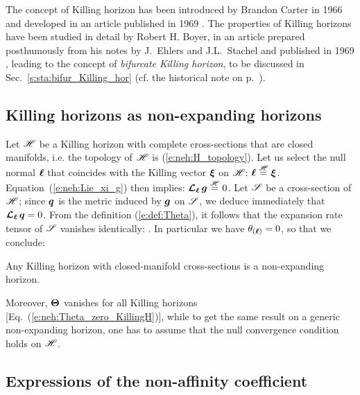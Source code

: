 \begin{hist}
The concept of Killing horizon has been introduced by Brandon Carter in
1966 \cite{Carte66,Carte67} and developed in an article published in
1969 \cite{Carte69}. The properties of Killing horizons have been
studied in detail by Robert H. Boyer,
in an article prepared posthumously from his notes
by J.~Ehlers and J.L.~Stachel and published in 1969 \cite{Boyer69},
leading to the concept of \emph{bifurcate Killing horizon}, to be discussed in
Sec.~\ref{s:sta:bifur_Killing_hor} (cf. the historical note on p.~\pageref{h:sta:Boyer}).
\end{hist}

\subsection{Killing horizons as non-expanding horizons}

Let $\mathscr{H}$ be a Killing horizon with complete cross-sections that are closed manifolds,
i.e. the topology of $\mathscr{H}$ is (\ref{e:neh:H_topology}). Let us select the null normal $\bm{\ell}$
that coincides with the Killing vector $\bm{\xi}$ on $\mathscr{H}$:
$\bm{\ell} \stackrel{\mathscr{H}}{=} \bm{\xi}$.
Equation~(\ref{e:neh:Lie_xi_g}) then implies: $\bm{\mathcal{L}}_{\bm{\ell}}\, \bm{g} \stackrel{\mathscr{H}}{=} 0$.
Let $\mathscr{S}$ be a cross-section of $\mathscr{H}$; since $\bm{q}$ is the metric induced by $\bm{g}$
on $\mathscr{S}$, we deduce immediately that
$\bm{\mathcal{L}}_{\bm{\ell}}\, \bm{q} = 0$.
From the definition (\ref{e:def:Theta}), it follows that the expansion rate
tensor of $\mathscr{S}$ vanishes identically:
\be \label{e:neh:Theta_zero_KillingH}
   .
\ee
In particular we have $\theta_{(\bm{\ell})} = 0$, so that we conclude:
\begin{prop}
Any Killing horizon with closed-manifold cross-sections is a non-expanding horizon.
\end{prop}
Moreover, $\bm{\Theta}$ vanishes
for all Killing horizons [Eq.~(\ref{e:neh:Theta_zero_KillingH})], while to get the same result on a generic non-expanding
horizon, one has to assume that the null convergence condition holds on $\mathscr{H}$.

\subsection{Expressions of the non-affinity coefficient}

